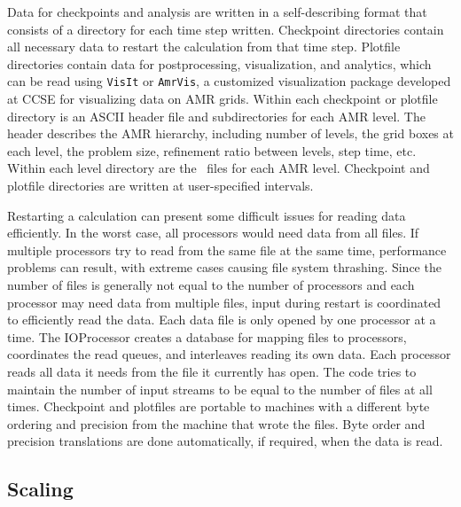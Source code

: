 Data for checkpoints and analysis are written in a self-describing format that consists 
of a directory for each time step written. Checkpoint directories contain all necessary 
data to restart the calculation from that time step. Plotfile directories contain data 
for postprocessing, visualization, and analytics, which can be read using {\tt VisIt} or
{\tt AmrVis}, a customized visualization package developed at CCSE for visualizing 
data on AMR grids.  Within each checkpoint or plotfile directory is an ASCII header file and 
subdirectories for each AMR level. The header describes the AMR hierarchy, including 
number of levels, the grid boxes at each level, the problem size, refinement ratio 
between levels, step time, etc. Within each level directory are the \MultiFab\ files for 
each AMR level. Checkpoint and plotfile directories are written at user-specified intervals. 

Restarting a calculation can present some difficult issues for reading data efficiently. 
In the worst case, all processors would need data from all files. If multiple processors 
try to read from the same file at the same time, performance problems can result, with 
extreme cases causing file system thrashing. Since the number of files is generally not 
equal to the number of processors and each processor may need data from multiple files, 
input during restart is coordinated to efficiently read the data. Each data file is only 
opened by one processor at a time. The IOProcessor creates a database for mapping files 
to processors, coordinates the read queues, and interleaves reading its own data. Each 
processor reads all data it needs from the file it currently has open. The code tries to 
maintain the number of input streams to be equal to the number of files at all times. 
Checkpoint and plotfiles are portable to machines with a different byte ordering and 
precision from the machine that wrote the files. Byte order and precision translations 
are done automatically, if required, when the data is read.

\subsection{Scaling}

